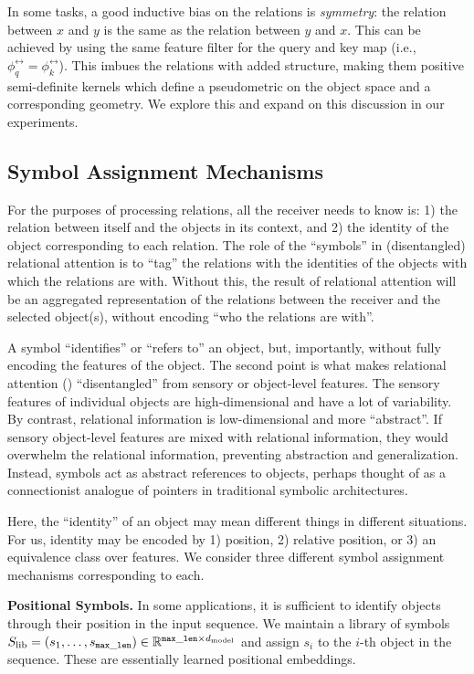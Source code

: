 In some tasks, a good inductive bias on the relations is \textit{symmetry}: the relation between $x$ and $y$ is the same as the relation between $y$ and $x$. This can be achieved by using the same feature filter for the query and key map (i.e., $\phi_q^{\rel} = \phi_k^{\rel}$). This imbues the relations with added structure, making them positive semi-definite kernels which define a pseudometric on the object space and a corresponding geometry. We explore this and expand on this discussion in our experiments.

\subsection{Symbol Assignment Mechanisms}

For the purposes of processing relations, all the receiver needs to know is: 1) the relation between itself and the objects in its context, and 2) the identity of the object corresponding to each relation. The role of the ``symbols'' in (disentangled) relational attention is to ``tag'' the relations with the identities of the objects with which the relations are with. Without this, the result of relational attention will be an aggregated representation of the relations between the receiver and the selected object(s), without encoding ``who the relations are with''.

A symbol ``identifies'' or ``refers to'' an object, but, importantly, without fully encoding the features of the object. The second point is what makes relational attention () ``disentangled'' from sensory or object-level features. The sensory features of individual objects are high-dimensional and have a lot of variability. By contrast, relational information is low-dimensional and more ``abstract''. If sensory object-level features are mixed with relational information, they would overwhelm the relational information, preventing abstraction and generalization. Instead, symbols act as abstract references to objects, perhaps thought of as a connectionist analogue of pointers in traditional symbolic architectures.

Here, the ``identity'' of an object may mean different things in different situations. For us, identity may be encoded by 1) position, 2) relative position, or 3) an equivalence class over features. We consider three different symbol assignment mechanisms corresponding to each.

\textbf{Positional Symbols.} In some applications, it is sufficient to identify objects through their position in the input sequence. We maintain a library of symbols $S_\mathrm{lib} = (s_1, \ldots, s_{\mathtt{max\_len}}) \in \mathbb{R}^{\mathtt{max\_len} \times d_{\mathrm{model}}}$ and assign $s_i$ to the $i$-th object in the sequence. These are essentially learned positional embeddings.

